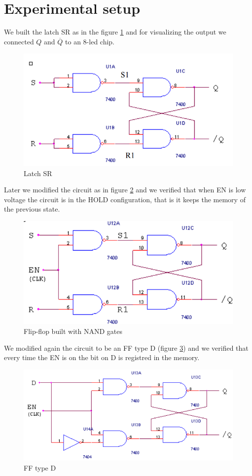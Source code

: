 \section{Experimental setup}
We built the latch SR as in the figure \ref{SR_NAND} and for visualizing the output we  connected $Q$ and $\overline{Q}$ to an 8-led chip.
\begin{figure}[H]
\centering
\includegraphics[width=.7\textwidth]{11/SR_NAND.png}
\caption{Latch SR}\label{SR_NAND}
\end{figure}
Later we modified the circuit as in figure \ref{FF_SR_NAND} and we verified that when EN is low voltage the circuit is in the HOLD configuration, that is it keeps the memory of the previous state. 
\begin{figure}[H]
\centering
\includegraphics[width=.7\textwidth]{11/FF_SR_NAND.png}
\caption{Flip-flop built with NAND gates}\label{FF_SR_NAND}

\end{figure}
We modified again the circuit to be an FF type D (figure \ref{D_FF}) and we verified that every time the EN is on the bit on D is registred in the memory.
\begin{figure}[H]
\centering
\includegraphics[width=.7\textwidth]{11/D_FF.png}
\caption{FF type D}\label{D_FF}

\end{figure}

